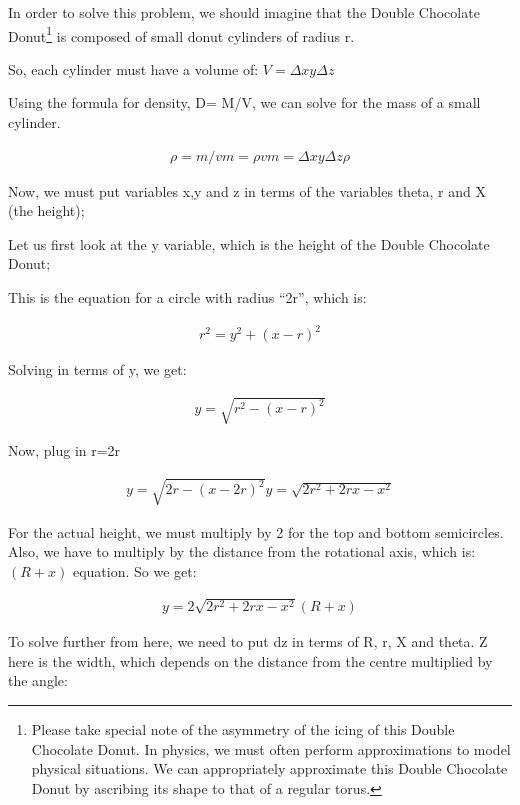 \begin{solution}

In order to solve this problem, we should imagine that the Double Chocolate Donut\footnote{Please take special note of the asymmetry of the icing of this Double Chocolate Donut. In physics, we must often perform approximations to model physical situations. We can appropriately approximate this Double Chocolate Donut by ascribing its shape to that of a regular torus.} is composed of small donut cylinders of radius r.

So, each cylinder must have a volume of: $V=\Delta xy\Delta z$

Using the formula for density, D= M/V, we can solve for the mass of a small cylinder.

\begin{align*}
\rho=m/v
m=\rho v
m=\Delta xy\Delta z\rho
\end{align*}

Now, we must put variables x,y and z in terms of the variables theta, r and X (the height);

Let us first look at the y variable, which is the height of the Double Chocolate Donut;

This is the equation for a circle with radius ``2r'', which is:

\begin{align*}
r^{2}=y^{2}+(x-r)^{2}
\end{align*}

Solving in terms of y, we get:

\begin{align*}
y=\sqrt{r^{2}-(x-r)^{2}}
\end{align*}

Now, plug in r=2r

\begin{align*}
y=\sqrt{2r-(x-2r)^{2}}
y=\sqrt{2r^{2}+2rx-x^{2}}
\end{align*}

For the actual height, we must multiply by 2 for the top and bottom semicircles. Also, we have to multiply by the distance from the rotational axis, which is: $(R+x)$ equation. So we get:

\begin{align*}
y=2\sqrt{2r^{2}+2rx-x^{2}}(R+x)
\end{align*}

To solve further from here, we need to put dz in terms of R, r, X and theta. Z here is the width, which depends on the distance from the centre multiplied by the angle:


\end{solution}
